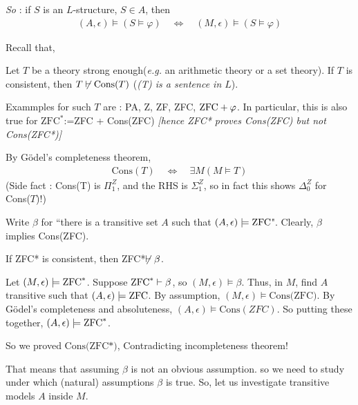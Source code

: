 \documentclass[12pt,a4paper]{article}
\newenvironment{proof}
{\begin{changemargin}{0.5cm}{0.5cm} 
	}%
	{\end{changemargin}
}
\newenvironment{p}
{\begin{proof} 
	}%
	{\end{proof}
}
\begin{document}
\quad \emph{So} : if $S$ is an $L$-structure, $S\in A$, then 
\begin{align*}
(A, \epsilon) \models (S\models \varphi) \quad \Leftrightarrow \quad(M, \epsilon)\models (S\models \varphi)
\end{align*}
\s

Recall that,

 Let $T$ be a theory strong enough(\textit{e.g.} an arithmetic theory or a set theory). If $T$ is consistent, then $T \not\vdash \text{Cons}(T)$ (\emph{(T) is a sentence in $L$}).

\quad Exammples for such $T$ are : PA, Z, ZF, ZFC, $\text{ZFC} +\varphi$. In particular, this is also true for $\text{ZFC}^*$:=ZFC + Cons(ZFC) \emph{[hence ZFC* proves Cons(ZFC) but not Cons(ZFC*)]}
\s

By G\"odel's completeness theorem,
\begin{align*}
\text{Cons}(T) \quad \Leftrightarrow \quad \exists M (M \models T)
\end{align*} 
(Side fact : Cons(T) is $\Pi_1^Z$, and the RHS is $\Sigma_1^Z$, so in fact this shows $\Delta_0^Z$ for Cons($T$)!)
\s

 Write $\beta$ for ``there is a transitive set $A$ such that $(A, \epsilon) \models \text{ZFC}$". Clearly, $\beta$ implies Cons(ZFC).
\s

\thm If ZFC* is consistent, then ZFC*$\not\vdash \beta$.
\begin{p}
\pf Let $(M, \epsilon) \models \text{ZFC}^*$. Suppose $\text{ZFC}^* \vdash \beta$, so $(M, \epsilon) \models \beta$. Thus, in $M$, find $A$ transitive such that $(A, \epsilon) \models \text{ZFC}$. By assumption, $(M, \epsilon) \models \text{Cons(ZFC)}$. By G\"{o}del's completeness and absoluteness, $(A, \epsilon) \models \text{Cons}(ZFC)$. So putting these together, $(A, \epsilon) \models \text{ZFC}^*$.

\quad So we proved $\text{Cons(ZFC*)}$, Contradicting incompleteness theorem!

\eop
\end{p}
\s

That means that assuming $\beta$ is not an obvious assumption. so we need to study under which (natural) assumptions $\beta$ is true. So, let us investigate transitive models $A$ inside $M$.
\end{document}
